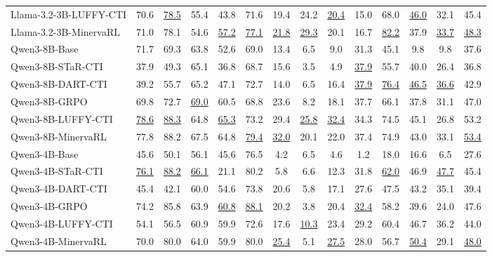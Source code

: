 \begin{table}[t]
{\begin{tabular}{lccccccccccccc}
Llama-3.2-3B-LUFFY-CTI & 70.6 & \underline{78.5} & 55.4 & 43.8 & 71.6 & 19.4 & 24.2 & \underline{20.4} & 15.0 & 68.0 & \underline{46.0} & 32.1 & 45.4 \\
Llama-3.2-3B-MinervaRL & 71.0 & 78.1 & 54.6 & \underline{57.2} & \underline{77.1} & \underline{21.8} & \underline{29.3} & 20.1 & 16.7 & \underline{82.2} & 37.9 & \underline{33.7} & \underline{48.3} \\
\midrule
Qwen3-8B-Base & 71.7 & 69.3 & 63.8 & 52.6 & 69.0 & 13.4 & 6.5 & 9.0 & 31.3 & 45.1 & 9.8 & 9.8 & 37.6 \\
Qwen3-8B-STaR-CTI & 37.9 & 49.3 & 65.1 & 36.8 & 68.7 & 15.6 & 3.5 & 4.9 & \underline{37.9} & 55.7 & 40.0 & 26.4 & 36.8 \\
Qwen3-8B-DART-CTI & 39.2 & 55.7 & 65.2 & 47.1 & 72.7 & 14.0 & 6.5 & 16.4 & \underline{37.9} & \underline{76.4} & \underline{46.5} & \underline{36.6} & 42.9 \\
Qwen3-8B-GRPO & 69.8 & 72.7 & \underline{69.0} & 60.5 & 68.8 & 23.6 & 8.2 & 18.1 & 37.7 & 66.1 & 37.8 & 31.1 & 47.0 \\
Qwen3-8B-LUFFY-CTI & \underline{78.6} & \underline{88.3} & 64.8 & \underline{65.3} & 73.2 & 29.4 & \underline{25.8} & \underline{32.4} & 34.3 & 74.5 & 45.1 & 26.8 & 53.2 \\
Qwen3-8B-MinervaRL & 77.8 & 88.2 & 67.5 & 64.8 & \underline{79.4} & \underline{32.0} & 20.1 & 22.0 & 37.4 & 74.9 & 43.0 & 33.1 & \underline{53.4} \\
\midrule
Qwen3-4B-Base & 45.6 & 50.1 & 56.1 & 45.6 & 76.5 & 4.2 & 6.5 & 4.6 & 1.2 & 18.0 & 16.6 & 6.5 & 27.6 \\
Qwen3-4B-STaR-CTI & \underline{76.1} & \underline{88.2} & \underline{66.1} & 21.1 & 80.2 & 5.8 & 6.6 & 12.3 & 31.8 & \underline{62.0} & 46.9 & \underline{47.7} & 45.4 \\
Qwen3-4B-DART-CTI & 45.4 & 42.1 & 60.0 & 54.6 & 73.8 & 20.6 & 5.8 & 17.1 & 27.6 & 47.5 & 43.2 & 35.1 & 39.4 \\
Qwen3-4B-GRPO & 74.2 & 85.8 & 63.9 & \underline{60.8} & \underline{88.1} & 20.2 & 3.8 & 20.4 & \underline{32.4} & 58.2 & 39.6 & 24.0 & 47.6 \\
Qwen3-4B-LUFFY-CTI & 54.1 & 56.5 & 60.9 & 59.9 & 72.6 & 17.6 & \underline{10.3} & 23.4 & 29.2 & 60.4 & 46.7 & 36.2 & 44.0 \\
Qwen3-4B-MinervaRL & 70.0 & 80.0 & 64.0 & 59.9 & 80.0 & \underline{25.4} & 5.1 & \underline{27.5} & 28.0 & 56.7 & \underline{50.4} & 29.1 & \underline{48.0} \\
\bottomrule
\end{tabular}%
}
\end{table}

